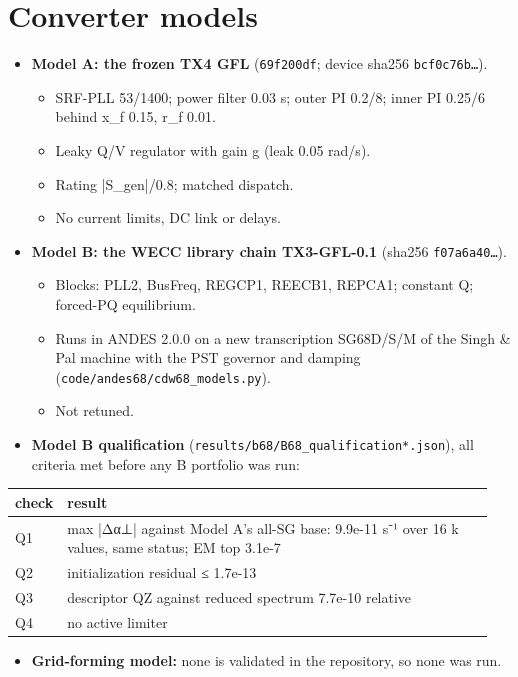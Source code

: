 \documentclass[10pt,a4paper]{article}
\begin{document}
\section{Converter models}
\begin{itemize}
\item \textbf{Model A: the frozen TX4 GFL} (\texttt{69f200df}; device sha256 \texttt{bcf0c76b…}).
\begin{itemize}
\item SRF-PLL 53/1400; power filter 0.03 s; outer PI 0.2/8; inner PI 0.25/6 behind x\_f 0.15, r\_f 0.01.
\item Leaky Q/V regulator with gain g (leak 0.05 rad/s).
\item Rating |S\_gen|/0.8; matched dispatch.
\item No current limits, DC link or delays.
\end{itemize}
\item \textbf{Model B: the WECC library chain TX3-GFL-0.1} (sha256 \texttt{f07a6a40…}).
\begin{itemize}
\item Blocks: PLL2, BusFreq, REGCP1, REECB1, REPCA1; constant Q; forced-PQ equilibrium.
\item Runs in ANDES 2.0.0 on a new transcription SG68D/S/M of the Singh \& Pal machine with the PST governor and damping (\texttt{code/\allowbreak{}andes68/\allowbreak{}cdw68\_\allowbreak{}models.py}).
\item Not retuned.
\end{itemize}
\item \textbf{Model B qualification} (\texttt{results/\allowbreak{}b68/\allowbreak{}B68\_\allowbreak{}qualification*.json}), all criteria met before any B portfolio was run:
\end{itemize}
{\small
\begin{longtable}{L{0.060\linewidth}L{0.894\linewidth}}
\toprule
\textbf{check} & \textbf{result} \\
\midrule
\endhead
Q1 & max |Δα⊥| against Model A's all-SG base: 9.9e-11 s⁻¹ over 16 k values, same status; EM top 3.1e-7 \\
Q2 & initialization residual ≤ 1.7e-13 \\
Q3 & descriptor QZ against reduced spectrum 7.7e-10 relative \\
Q4 & no active limiter \\
\bottomrule
\end{longtable}}
\begin{itemize}
\item \textbf{Grid-forming model:} none is validated in the repository, so none was run.
\end{itemize}
\end{document}
